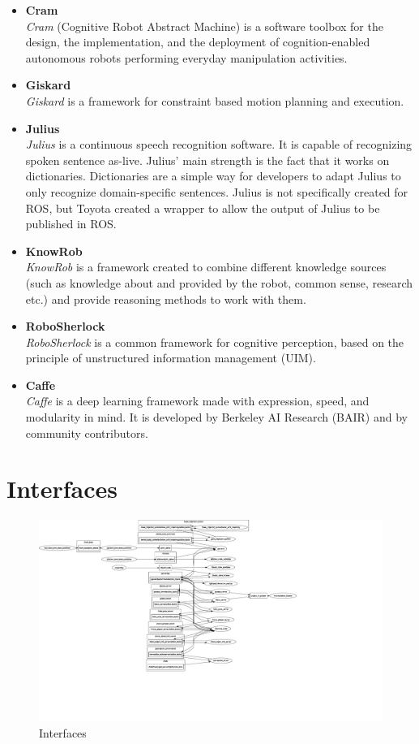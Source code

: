 \documentclass[main.tex]{subfiles}
\begin{document}
			\begin{itemize}
				\item{\textbf{Cram}} \\
					 \textit{Cram} (Cognitive Robot Abstract Machine) is a software toolbox for the design, the implementation, and the deployment of cognition-enabled autonomous robots performing everyday manipulation activities.
				\item{\textbf{Giskard}} \\
					\textit{Giskard} is a  framework for constraint based motion planning and execution.
				\item{\textbf{Julius}} \\
					\textit{Julius} is a continuous speech recognition software. It is capable of recognizing spoken sentence as-live. Julius' main strength is the fact that it works on dictionaries. Dictionaries are a simple way for developers to adapt Julius to only recognize domain-specific sentences. Julius is not specifically created for ROS, but Toyota created a wrapper to allow the output of Julius to be published in ROS.
				\item{\textbf{KnowRob}} \\
				    \textit{KnowRob} is a framework created to combine different knowledge sources (such as knowledge about and provided by the robot, common sense, research etc.) and provide reasoning methods to work with them. 
				\item{\textbf{RoboSherlock}} \\
					\textit{RoboSherlock} is a common framework for cognitive perception, based on the principle of unstructured information management (UIM).
				\item{\textbf{Caffe}} \\
					\textit{Caffe} is a deep learning framework made with expression, speed, and modularity in mind. It is developed by Berkeley AI Research (BAIR) and by community contributors.
			\end{itemize}
		
		\section{Interfaces}
		
		\begin{figure}[H]
			\centering
			\includegraphics[width=1.5\textwidth]{pictures/diagramms/rosgraph}
			\caption{Interfaces}
			\label{interfaces}
		\end{figure}
\end{document}
